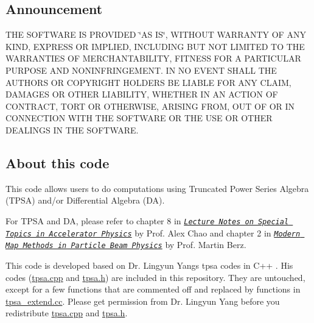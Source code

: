 \subsection*{Announcement}

T\+HE S\+O\+F\+T\+W\+A\+RE IS P\+R\+O\+V\+I\+D\+ED \char`\"{}\+A\+S I\+S\char`\"{}, W\+I\+T\+H\+O\+UT W\+A\+R\+R\+A\+N\+TY OF A\+NY K\+I\+ND, E\+X\+P\+R\+E\+SS OR I\+M\+P\+L\+I\+ED, I\+N\+C\+L\+U\+D\+I\+NG B\+UT N\+OT L\+I\+M\+I\+T\+ED TO T\+HE W\+A\+R\+R\+A\+N\+T\+I\+ES OF M\+E\+R\+C\+H\+A\+N\+T\+A\+B\+I\+L\+I\+TY, F\+I\+T\+N\+E\+SS F\+OR A P\+A\+R\+T\+I\+C\+U\+L\+AR P\+U\+R\+P\+O\+SE A\+ND N\+O\+N\+I\+N\+F\+R\+I\+N\+G\+E\+M\+E\+NT. IN NO E\+V\+E\+NT S\+H\+A\+LL T\+HE A\+U\+T\+H\+O\+RS OR C\+O\+P\+Y\+R\+I\+G\+HT H\+O\+L\+D\+E\+RS BE L\+I\+A\+B\+LE F\+OR A\+NY C\+L\+A\+IM, D\+A\+M\+A\+G\+ES OR O\+T\+H\+ER L\+I\+A\+B\+I\+L\+I\+TY, W\+H\+E\+T\+H\+ER IN AN A\+C\+T\+I\+ON OF C\+O\+N\+T\+R\+A\+CT, T\+O\+RT OR O\+T\+H\+E\+R\+W\+I\+SE, A\+R\+I\+S\+I\+NG F\+R\+OM, O\+UT OF OR IN C\+O\+N\+N\+E\+C\+T\+I\+ON W\+I\+TH T\+HE S\+O\+F\+T\+W\+A\+RE OR T\+HE U\+SE OR O\+T\+H\+ER D\+E\+A\+L\+I\+N\+GS IN T\+HE S\+O\+F\+T\+W\+A\+RE.

\subsection*{About this code}

This code allows users to do computations using Truncated Power Series Algebra (T\+P\+SA) and/or Differential Algebra (DA).

For T\+P\+SA and DA, please refer to chapter 8 in \href{http://inspirehep.net/record/595287/files/slac-pub-9574.pdf}{\texttt{ {\itshape Lecture Notes on Special Topics in Accelerator Physics}}} by Prof. Alex Chao and chapter 2 in \href{http://bt.pa.msu.edu/cgi-bin/display.pl?name=AIEP108book}{\texttt{ {\itshape Modern Map Methods in Particle Beam Physics}}} by Prof. Martin Berz.

This code is developed based on Dr. Lingyun Yang\textquotesingle{}s tpsa codes in C++ . His codes (\mbox{\hyperlink{tpsa_8cpp}{tpsa.\+cpp}} and \mbox{\hyperlink{tpsa_8h}{tpsa.\+h}}) are included in this repository. They are untouched, except for a few functions that are commented off and replaced by functions in \mbox{\hyperlink{tpsa__extend_8cc}{tpsa\+\_\+extend.\+cc}}. Please get permission from Dr. Lingyun Yang before you redistribute \mbox{\hyperlink{tpsa_8cpp}{tpsa.\+cpp}} and \mbox{\hyperlink{tpsa_8h}{tpsa.\+h}}.

